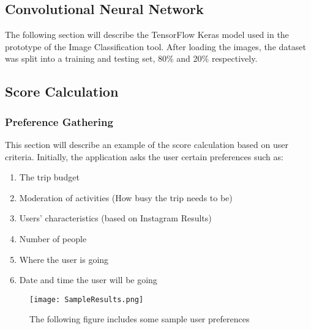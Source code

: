 \subsection{Convolutional Neural Network}
The following section will describe the TensorFlow Keras
\cite{tensorflow2015-whitepaper} model used in the prototype of the
Image Classification tool.  
After loading the images, the dataset was split into a training and
testing set, 80\% and 20\% respectively.

\subsection{Score Calculation}

    \subsubsection{Preference Gathering}
        This section will describe an example of the score calculation based
        on user criteria. Initially, the application asks the user certain
        preferences such as:
        \begin{enumerate}
            \item The trip budget
            \item Moderation of activities (How busy the trip needs to be)
            \item Users’ characteristics (based on Instagram Results)
            \item Number of people
            \item Where the user is going
            \item Date and time the user will be going
        \end{enumerate}

        \begin{figure}[H]
            \caption{The following figure includes some sample user preferences        }
            \centering
            \texttt{[image: SampleResults.png]}
            \label{dataset}
        \end{figure}

